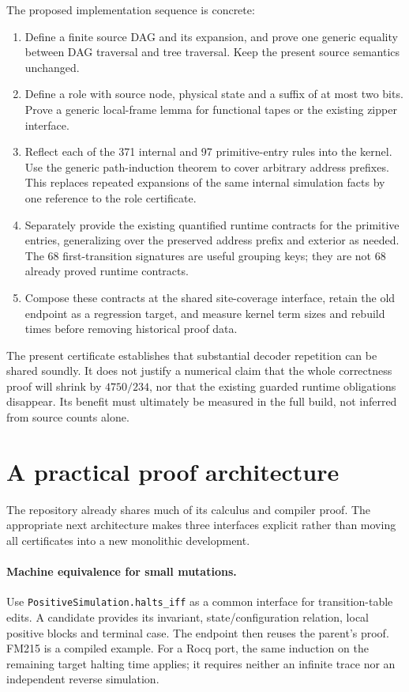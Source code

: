 \documentclass[11pt,a4paper]{article}
\begin{document}
The proposed implementation sequence is concrete:
\begin{enumerate}
\item Define a finite source DAG and its expansion, and prove one generic
  equality between DAG traversal and tree traversal. Keep the present
  source semantics unchanged.
\item Define a role with source node, physical state and a suffix of at
  most two bits. Prove a generic local-frame lemma for functional tapes
  or the existing zipper interface.
\item Reflect each of the 371 internal and 97 primitive-entry rules into
  the kernel. Use the generic path-induction theorem to cover arbitrary
  address prefixes. This replaces repeated expansions of the same
  internal simulation facts by one reference to the role certificate.
\item Separately provide the existing quantified runtime contracts for
  the primitive entries, generalizing over the preserved address prefix
  and exterior as needed. The 68 first-transition signatures are useful
  grouping keys; they are not 68 already proved runtime contracts.
\item Compose these contracts at the shared site-coverage interface,
  retain the old endpoint as a regression target, and measure kernel term
  sizes and rebuild times before removing historical proof data.
\end{enumerate}

The present certificate establishes that substantial decoder repetition
can be shared soundly. It does not justify a numerical claim that the
whole correctness proof will shrink by $4750/234$, nor that the existing
guarded runtime obligations disappear. Its benefit must ultimately be
measured in the full build, not inferred from source counts alone.

\section{A practical proof architecture}
\label{sec:architecture}

The repository already shares much of its calculus and compiler proof.
The appropriate next architecture makes three interfaces explicit rather
than moving all certificates into a new monolithic development.

\paragraph{Machine equivalence for small mutations.}
Use \texttt{PositiveSimulation.halts\_iff} as a common interface for
transition-table edits. A candidate provides its invariant, state/configuration
relation, local positive blocks and terminal case. The endpoint then
reuses the parent's proof. FM215 is a compiled example. For a Rocq port,
the same induction on the remaining target halting time applies; it
requires neither an infinite trace nor an independent reverse simulation.
\end{document}
